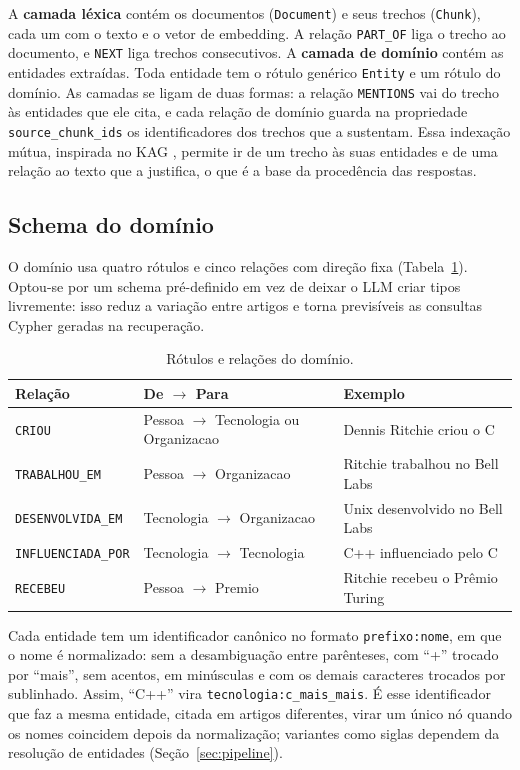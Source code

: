 \documentclass[12pt]{article}
\begin{document}
A \textbf{camada léxica} contém os documentos (\texttt{Document}) e seus trechos
(\texttt{Chunk}), cada um com o texto e o vetor de embedding. A relação \texttt{PART\_OF}
liga o trecho ao documento, e \texttt{NEXT} liga trechos consecutivos. A \textbf{camada de
domínio} contém as entidades extraídas. Toda entidade tem o rótulo genérico
\texttt{Entity} e um rótulo do domínio. As camadas se ligam de duas formas: a relação
\texttt{MENTIONS} vai do trecho às entidades que ele cita, e cada relação de domínio
guarda na propriedade \texttt{source\_chunk\_ids} os identificadores dos trechos que a
sustentam. Essa indexação mútua, inspirada no KAG \cite{liang2024kag}, permite ir de um
trecho às suas entidades e de uma relação ao texto que a justifica, o que é a base da
procedência das respostas.

\subsection{Schema do domínio}

O domínio usa quatro rótulos e cinco relações com direção fixa
(Tabela~\ref{tab:dominio}). Optou-se por um schema pré-definido em vez de deixar o LLM
criar tipos livremente: isso reduz a variação entre artigos e torna previsíveis as
consultas Cypher geradas na recuperação.

\begin{table}[ht]
\centering
\caption{Rótulos e relações do domínio.}
\label{tab:dominio}
\footnotesize
\begin{tabular}{lll}
\toprule
\textbf{Relação} & \textbf{De $\rightarrow$ Para} & \textbf{Exemplo} \\
\midrule
\texttt{CRIOU} & Pessoa $\rightarrow$ Tecnologia ou Organizacao & Dennis Ritchie criou o C \\
\texttt{TRABALHOU\_EM} & Pessoa $\rightarrow$ Organizacao & Ritchie trabalhou no Bell Labs \\
\texttt{DESENVOLVIDA\_EM} & Tecnologia $\rightarrow$ Organizacao & Unix desenvolvido no Bell Labs \\
\texttt{INFLUENCIADA\_POR} & Tecnologia $\rightarrow$ Tecnologia & C++ influenciado pelo C \\
\texttt{RECEBEU} & Pessoa $\rightarrow$ Premio & Ritchie recebeu o Prêmio Turing \\
\bottomrule
\end{tabular}
\end{table}

Cada entidade tem um identificador canônico no formato \texttt{prefixo:nome}, em que o
nome é normalizado: sem a desambiguação entre parênteses, com ``+'' trocado por ``mais'',
sem acentos, em minúsculas e com os demais caracteres trocados por sublinhado. Assim,
``C++'' vira \texttt{tecnologia:c\_mais\_mais}. É esse identificador que faz a mesma
entidade, citada em artigos diferentes, virar um único nó quando os nomes coincidem depois
da normalização; variantes como siglas dependem da resolução de entidades
(Seção~\ref{sec:pipeline}).
\end{document}
